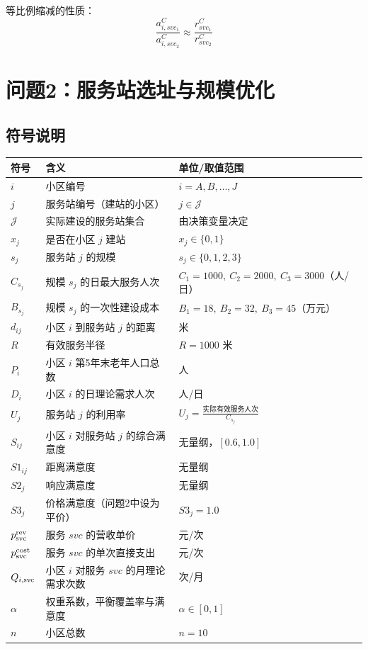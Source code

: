 \documentclass[12pt,a4paper]{article}
\begin{document}
等比例缩减的性质：
\begin{equation}
\frac{a_{i,svc_1}^C}{a_{i,svc_2}^C} \approx \frac{r_{svc_1}^C}{r_{svc_2}^C}
\tag{3.5}
\end{equation}

\section{问题2：服务站选址与规模优化}

\subsection{符号说明}
\begin{table}[h]
\centering
\begin{tabular}{>{\raggedright\arraybackslash}p{3cm} >{\raggedright\arraybackslash}p{6cm} >{\raggedright\arraybackslash}p{4cm}}
\toprule
符号 & 含义 & 单位/取值范围 \\
\midrule
$i$ & 小区编号 & $i = A,B,\dots,J$ \\
$j$ & 服务站编号（建站的小区） & $j \in \mathcal{J}$ \\
$\mathcal{J}$ & 实际建设的服务站集合 & 由决策变量决定 \\
$x_j$ & 是否在小区 $j$ 建站 & $x_j \in \{0,1\}$ \\
$s_j$ & 服务站 $j$ 的规模 & $s_j \in \{0,1,2,3\}$ \\
$C_{s_j}$ & 规模 $s_j$ 的日最大服务人次 & $C_1=1000,\ C_2=2000,\ C_3=3000$（人/日） \\
$B_{s_j}$ & 规模 $s_j$ 的一次性建设成本 & $B_1=18,\ B_2=32,\ B_3=45$（万元） \\
$d_{ij}$ & 小区 $i$ 到服务站 $j$ 的距离 & 米 \\
$R$ & 有效服务半径 & $R=1000$ 米 \\
$P_i$ & 小区 $i$ 第5年末老年人口总数 & 人 \\
$D_i$ & 小区 $i$ 的日理论需求人次 & 人/日 \\
$U_j$ & 服务站 $j$ 的利用率 & $U_j = \frac{\text{实际有效服务人次}}{C_{s_j}}$ \\
$S_{ij}$ & 小区 $i$ 对服务站 $j$ 的综合满意度 & 无量纲，$[0.6,1.0]$ \\
$S1_{ij}$ & 距离满意度 & 无量纲 \\
$S2_j$ & 响应满意度 & 无量纲 \\
$S3_j$ & 价格满意度（问题2中设为平价） & $S3_j = 1.0$ \\
$p_{\rm svc}^{\rm rev}$ & 服务 $svc$ 的营收单价 & 元/次 \\
$p_{\rm svc}^{\rm cost}$ & 服务 $svc$ 的单次直接支出 & 元/次 \\
$Q_{i,\rm svc}$ & 小区 $i$ 对服务 $svc$ 的月理论需求次数 & 次/月 \\
$\alpha$ & 权重系数，平衡覆盖率与满意度 & $\alpha \in [0,1]$ \\
$n$ & 小区总数 & $n=10$ \\
\bottomrule
\end{tabular}
\end{table}
\end{document}
